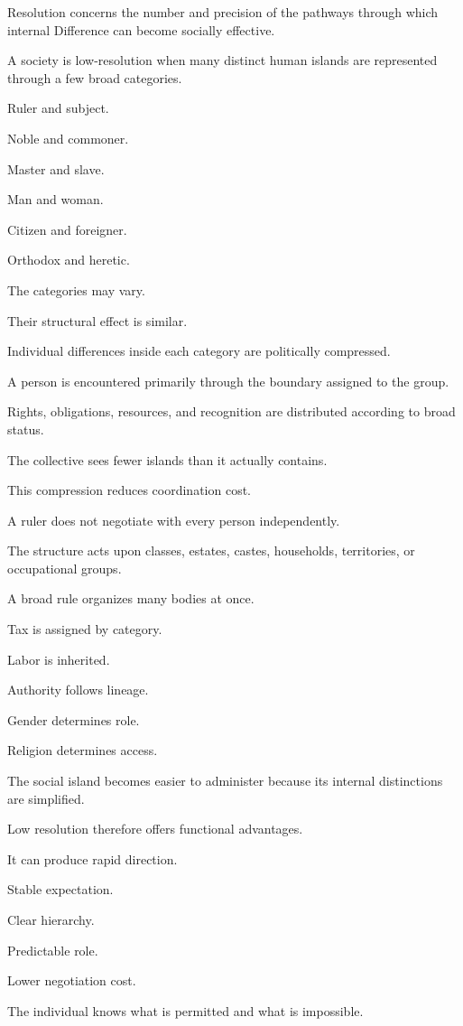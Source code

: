 Resolution concerns the number and precision of the pathways through which internal Difference can become socially effective.

A society is low-resolution when many distinct human islands are represented through a few broad categories.

Ruler and subject.

Noble and commoner.

Master and slave.

Man and woman.

Citizen and foreigner.

Orthodox and heretic.

The categories may vary.

Their structural effect is similar.

Individual differences inside each category are politically compressed.

A person is encountered primarily through the boundary assigned to the group.

Rights, obligations, resources, and recognition are distributed according to broad status.

The collective sees fewer islands than it actually contains.

This compression reduces coordination cost.

A ruler does not negotiate with every person independently.

The structure acts upon classes, estates, castes, households, territories, or occupational groups.

A broad rule organizes many bodies at once.

Tax is assigned by category.

Labor is inherited.

Authority follows lineage.

Gender determines role.

Religion determines access.

The social island becomes easier to administer because its internal distinctions are simplified.

Low resolution therefore offers functional advantages.

It can produce rapid direction.

Stable expectation.

Clear hierarchy.

Predictable role.

Lower negotiation cost.

The individual knows what is permitted and what is impossible.

